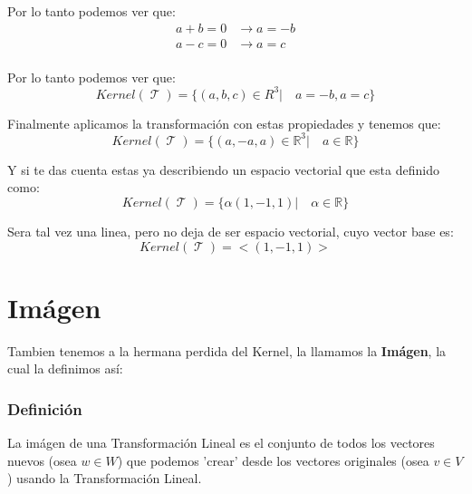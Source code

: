 \documentclass[12pt]{report}                                    %
\DeclareMathOperator \LinealTransformation {\mathcal{T}}
\begin{document}
            Por lo tanto podemos ver que:
            \begin{equation*}
            \begin{split}
                a + b = 0 &\to a = -b  \\
                a - c = 0 &\to a = c   \\
             \end{split}
            \end{equation*}

            Por lo tanto podemos ver que:
            \begin{equation*}
                Kernel(\LinealTransformation) = \{(a,b,c)\in R^3 |\quad a = -b, a=c\}
            \end{equation*}

            Finalmente aplicamos la transformación con estas propiedades y tenemos que:
            \begin{equation*}
                Kernel(\LinealTransformation) = \{(a,-a,a)\in \mathbb{R}^3 |\quad a \in \mathbb{R}\}
            \end{equation*}

            Y si te das cuenta estas ya describiendo un espacio vectorial que esta definido como:
            \begin{equation*}
                Kernel(\LinealTransformation) = \{\alpha(1,-1,1) |\quad \alpha\in \mathbb{R}\}
            \end{equation*}

            Sera tal vez una linea, pero no deja de ser espacio vectorial, cuyo vector base es:
            \begin{equation*}
                Kernel(\LinealTransformation) = <(1,-1,1)>
            \end{equation*}


    \clearpage
    \section{Imágen}
        Tambien tenemos a la hermana perdida del Kernel, la llamamos la \textbf{Imágen},
        la cual la definimos así:

        \subsubsection{Definición}
        La imágen de una Transformación Lineal es el conjunto de todos los vectores
        nuevos (osea $w \in W$) que podemos 'crear' desde los vectores originales
        (osea $v \in V$) usando la Transformación Lineal.
\end{document}
